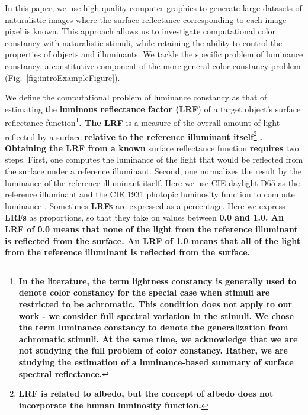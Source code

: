 \documentclass{jov}
\providecommand{\DIFaddtex}[1]{{\bf #1}} %
\providecommand{\DIFdeltex}[1]{} %
\providecommand{\DIFaddbegin}{} %
\providecommand{\DIFaddend}{} %
\providecommand{\DIFdelbegin}{} %
\providecommand{\DIFdelend}{} %
\providecommand{\DIFadd}[1]{\texorpdfstring{\DIFaddtex{#1}}{#1}} %
\providecommand{\DIFdel}[1]{\texorpdfstring{\DIFdeltex{#1}}{}} %
\newcommand{\DIFscaledelfig}{0.5}
\newlength{\DIFdelgraphicswidth} %
\newlength{\DIFdelgraphicsheight} %
\newcommand{\DIFaddincludegraphics}[2][]{{\color{blue}\fbox{\DIFOincludegraphics[#1]{#2}}}} %
\newcommand{\DIFdelincludegraphics}[2][]{%
\sbox{\DIFdelgraphicsbox}{\DIFOincludegraphics[#1]{#2}}%
\settoboxwidth{\DIFdelgraphicswidth}{\DIFdelgraphicsbox} %
\settoboxtotalheight{\DIFdelgraphicsheight}{\DIFdelgraphicsbox} %
\scalebox{\DIFscaledelfig}{%
\parbox[b]{\DIFdelgraphicswidth}{\usebox{\DIFdelgraphicsbox}\\[-\baselineskip] \rule{\DIFdelgraphicswidth}{0em}}\llap{\resizebox{\DIFdelgraphicswidth}{\DIFdelgraphicsheight}{%
\setlength{\unitlength}{\DIFdelgraphicswidth}%
\begin{picture}(1,1)%
\thicklines\linethickness{2pt} %
{\color[rgb]{1,0,0}\put(0,0){\framebox(1,1){}}}%
{\color[rgb]{1,0,0}\put(0,0){\line( 1,1){1}}}%
{\color[rgb]{1,0,0}\put(0,1){\line(1,-1){1}}}%
\end{picture}%
}\hspace*{3pt}}} %
} %
\DeclareRobustCommand{\DIFaddbegin}{\DIFOaddbegin \let\includegraphics\DIFaddincludegraphics} %
\DeclareRobustCommand{\DIFaddend}{\DIFOaddend \let\includegraphics\DIFOincludegraphics} %
\DeclareRobustCommand{\DIFdelbegin}{\DIFOdelbegin \let\includegraphics\DIFdelincludegraphics} %
\DeclareRobustCommand{\DIFdelend}{\DIFOaddend \let\includegraphics\DIFOincludegraphics} %
\begin{document}
In this paper, we use high-quality computer graphics to generate large datasets of naturalistic images where the surface reflectance corresponding to each image pixel is known. 
This approach allows us to investigate computational color constancy with naturalistic stimuli, while retaining the ability to control the properties of objects and illuminants. We tackle the specific problem of luminance constancy, a constitutive component of the more general color constancy problem (Fig.~\ref{fig:introExampleFigure}). 

We define the computational problem of luminance constancy as that of estimating the \DIFdelbegin \DIFdel{light reflectance value (LRV}\DIFdelend \DIFaddbegin \DIFadd{luminous reflectance factor (LRF}\DIFaddend ) of a target object's surface reflectance function\DIFdelbegin \DIFdel{.
The LRV }\DIFdelend \DIFaddbegin \footnote{\DIFadd{In the literature, the term lightness constancy is generally used to denote color constancy for the special case when stimuli are restricted to be achromatic. This condition does not apply to our work - we consider full spectral variation in the stimuli. We chose the term luminance constancy to denote the generalization from achromatic stimuli. At the same time, we acknowledge that we are not studying the full problem of color constancy. Rather, we are studying the estimation of a luminance-based summary of surface spectral reflectance.}}\DIFadd{.
The LRF }\DIFaddend is a measure of the overall amount of light reflected by a surface \DIFdelbegin \DIFdel{\cite{astm1121477}.
Estimating the LRV from a }\DIFdelend \DIFaddbegin \DIFadd{relative to the reference illuminant itself}\footnote{\DIFadd{LRF is related to albedo, but the concept of albedo does not incorporate the human luminosity function.}} \DIFadd{\cite{astm1121477}.
Obtaining the LRF from a known }\DIFaddend surface reflectance function \DIFdelbegin \DIFdel{proceeds in }\DIFdelend \DIFaddbegin \DIFadd{requires }\DIFaddend two steps.
First, one computes the luminance of the light that would be reflected from the surface under a reference illuminant.
Second, one normalizes the result by the luminance of the reference illuminant itself.
Here we use CIE daylight D65 as the reference illuminant and the CIE 1931 photopic luminosity function to compute luminance \cite{CIE86}.
Sometimes \DIFdelbegin \DIFdel{LRVs }\DIFdelend \DIFaddbegin \DIFadd{LRFs }\DIFaddend are expressed as a percentage.
Here we express \DIFdelbegin \DIFdel{LRVs }\DIFdelend \DIFaddbegin \DIFadd{LRFs }\DIFaddend as proportions, so that they take on values between \DIFdelbegin \DIFdel{0 and 1.
}\DIFdelend \DIFaddbegin \DIFadd{0.0 and 1.0. 
An LRF of 0.0 means that none of the light from the reference illuminant is reflected from the surface. 
An LRF of 1.0 means that all of the light from the reference illuminant is reflected from the surface.
}\DIFaddend 
\end{document}
